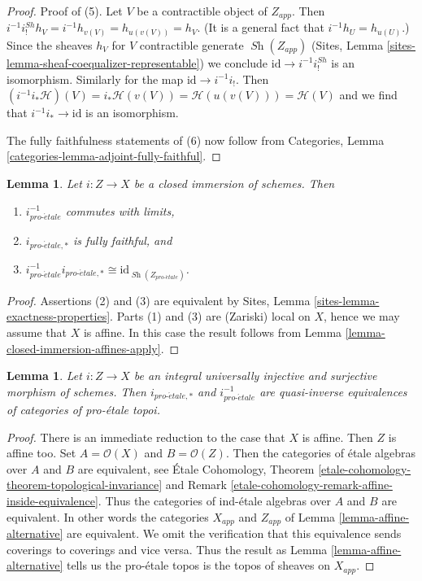 \documentclass{stacks-project}
\theoremstyle{plain}
\newtheorem{lemma}[subsection]{Lemma}
\theoremstyle{definition}
\theoremstyle{remark}
\numberwithin{equation}{subsection}
\def\Sh{\mathop{\mathit{Sh}}\nolimits}
\def\proetale{{pro\text{-}\acute{e}tale}}
\begin{document}
\begin{proof}
\medskip\noindent
Proof of (5). Let $V$ be a contractible object of $Z_{app}$.
Then $i^{-1}i^{Sh}_!h_V = i^{-1}h_{v(V)} = h_{u(v(V))} = h_V$.
(It is a general fact that $i^{-1}h_U = h_{u(U)}$.) Since the
sheaves $h_V$ for $V$ contractible generate $\Sh(Z_{app})$
(Sites, Lemma \ref{sites-lemma-sheaf-coequalizer-representable})
we conclude $\text{id} \to i^{-1}i^{Sh}_!$ is an isomorphism.
Similarly for the map $\text{id} \to i^{-1}i_!$. Then
$(i^{-1}i_*\mathcal{H})(V) = i_*\mathcal{H}(v(V)) =
\mathcal{H}(u(v(V))) = \mathcal{H}(V)$ and we find that
$i^{-1}i_* \to \text{id}$ is an isomorphism.

\medskip\noindent
The fully faithfulness statements of (6) now follow from
Categories, Lemma \ref{categories-lemma-adjoint-fully-faithful}.
\end{proof}

\begin{lemma}
\label{lemma-closed-immersion}
Let $i : Z \to X$ be a closed immersion of schemes. Then
\begin{enumerate}
\item $i_\proetale^{-1}$ commutes with limits,
\item $i_{\proetale, *}$ is fully faithful, and
\item $i_\proetale^{-1}i_{\proetale, *} \cong \text{id}_{\Sh(Z_\proetale)}$.
\end{enumerate}
\end{lemma}

\begin{proof}
Assertions (2) and (3) are equivalent by
Sites, Lemma \ref{sites-lemma-exactness-properties}.
Parts (1) and (3) are (Zariski) local on $X$, hence we may assume that
$X$ is affine. In this case the result follows from
Lemma \ref{lemma-closed-immersion-affines-apply}.
\end{proof}

\begin{lemma}
\label{lemma-thickening}
Let $i : Z \to X$ be an integral universally injective and surjective morphism
of schemes. Then
$i_{\proetale, *}$ and $i_\proetale^{-1}$ are quasi-inverse
equivalences of categories of pro-\'etale topoi.
\end{lemma}

\begin{proof}
There is an immediate reduction to the case that $X$ is affine.
Then $Z$ is affine too. Set $A = \mathcal{O}(X)$ and $B = \mathcal{O}(Z)$.
Then the categories of \'etale algebras over
$A$ and $B$ are equivalent, see 
\'Etale Cohomology, Theorem
\ref{etale-cohomology-theorem-topological-invariance} and
Remark \ref{etale-cohomology-remark-affine-inside-equivalence}.
Thus the categories of ind-\'etale algebras over $A$ and $B$ are
equivalent. In other words the categories $X_{app}$ and $Z_{app}$
of Lemma \ref{lemma-affine-alternative} are equivalent.
We omit the verification
that this equivalence sends coverings to coverings and vice versa.
Thus the result as Lemma \ref{lemma-affine-alternative}
tells us the pro-\'etale topos is the topos of sheaves on $X_{app}$.
\end{proof}
\end{document}
